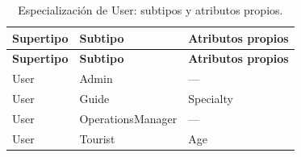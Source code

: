 \documentclass[11pt,a4paper]{article}
\begin{document}
{\footnotesize\setlength{\tabcolsep}{3pt}\renewcommand{\arraystretch}{1.15}
\begin{longtable}{|>{\raggedright\arraybackslash}p{3.28cm}|>{\raggedright\arraybackslash}p{4.28cm}|>{\raggedright\arraybackslash}p{7.98cm}|}
\caption{Especialización de User: subtipos y atributos propios.}\label{tab:especializacion}\\ \hline
\rowcolor{gray!20} \textbf{Supertipo} & \textbf{Subtipo} & \textbf{Atributos propios} \\ \hline
\endfirsthead
\hline \rowcolor{gray!20} \textbf{Supertipo} & \textbf{Subtipo} & \textbf{Atributos propios} \\ \hline
\endhead
User & Admin & — \\ \hline
User & Guide & Specialty \\ \hline
User & OperationsManager & — \\ \hline
User & Tourist & Age \\ \hline
\end{longtable}}
\vspace{2pt}
\end{document}
